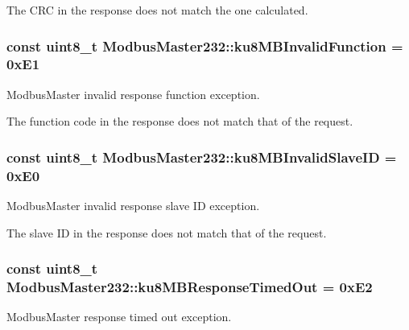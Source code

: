 The C\+RC in the response does not match the one calculated. 
\subsubsection[{\texorpdfstring{ku8\+M\+B\+Invalid\+Function}{ku8MBInvalidFunction}}]{\setlength{\rightskip}{0pt plus 5cm}const uint8\+\_\+t Modbus\+Master232\+::ku8\+M\+B\+Invalid\+Function = 0x\+E1\hspace{0.3cm}{\ttfamily [static]}}\hypertarget{class_modbus_master232_a6783cdbae073f65a8abfad3bc7a164f6}{}\label{class_modbus_master232_a6783cdbae073f65a8abfad3bc7a164f6}
Modbus\+Master invalid response function exception.

The function code in the response does not match that of the request. 
\subsubsection[{\texorpdfstring{ku8\+M\+B\+Invalid\+Slave\+ID}{ku8MBInvalidSlaveID}}]{\setlength{\rightskip}{0pt plus 5cm}const uint8\+\_\+t Modbus\+Master232\+::ku8\+M\+B\+Invalid\+Slave\+ID = 0x\+E0\hspace{0.3cm}{\ttfamily [static]}}\hypertarget{class_modbus_master232_a1a9b2e570613e0a753465c2c29c77710}{}\label{class_modbus_master232_a1a9b2e570613e0a753465c2c29c77710}
Modbus\+Master invalid response slave ID exception.

The slave ID in the response does not match that of the request. 
\subsubsection[{\texorpdfstring{ku8\+M\+B\+Response\+Timed\+Out}{ku8MBResponseTimedOut}}]{\setlength{\rightskip}{0pt plus 5cm}const uint8\+\_\+t Modbus\+Master232\+::ku8\+M\+B\+Response\+Timed\+Out = 0x\+E2\hspace{0.3cm}{\ttfamily [static]}}\hypertarget{class_modbus_master232_a1548431c365a54900c3e6cddae6bfe01}{}\label{class_modbus_master232_a1548431c365a54900c3e6cddae6bfe01}
Modbus\+Master response timed out exception.

